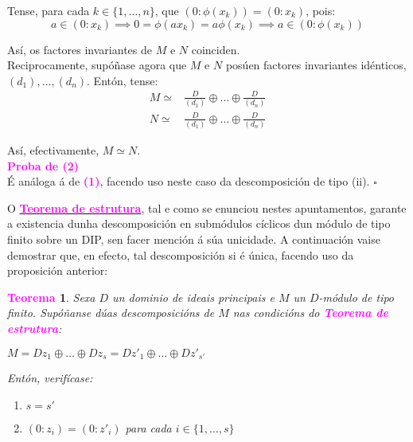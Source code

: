 \documentclass[twoside]{report}
\newcommand{\magbf}[1]{\textcolor{magenta}{\textbf{#1}}} %
\theoremstyle{mystyle}
\newtheorem{theo}{\magbf{Teorema}}[chapter]
\newenvironment{theorem}
{\begin{mdframed}[linecolor = magenta,backgroundcolor = classicrose, linewidth = 2mm]\begin{theo}}
{\end{theo}\end{mdframed}}
\begin{document}
\noindent Tense, para cada $k \in \{1, \dots, n\}$, que $(0 : \phi(x_{k})) = (0 : x_{k})$, pois:
$$a \in (0 : x_{k}) \implies 0 = \phi(ax_{k}) = a \phi(x_{k}) \implies a \in (0 : \phi(x_{k}))$$

\noindent Así, os factores invariantes de $M$ e $N$ coinciden.\\

\noindent {} Reciprocamente, supóñase agora que $M$ e $N$ posúen factores invariantes idénticos, $(d_{1}), \dots, (d_{n})$. Entón, tense:
\begin{align*}
    M \simeq & \displaystyle \frac{D}{(d_{1})} \oplus \dots \oplus \frac{D}{(d_{n})} \\
    N \simeq & \displaystyle \frac{D}{(d_{1})} \oplus \dots \oplus \frac{D}{(d_{n})}  
\end{align*}

\noindent Así, efectivamente, $M \simeq N$.\\

\noindent \magbf{Proba de (2)}\\

\noindent É análoga á de \magbf{(1)}, facendo uso neste caso da descomposición de tipo (ii). $\square$\\

\vspace{3mm}

\noindent O \hyperref[th4.2]{\magbf{Teorema de estrutura}}, tal e como se enunciou nestes apuntamentos, garante a existencia dunha descomposición en submódulos cíclicos dun módulo de tipo finito sobre un DIP, sen facer mención á súa unicidade. A continuación vaise demostrar que, en efecto, tal descomposición si é única, facendo uso da proposición anterior:\\

\begin{theorem} \label{th4.4}
Sexa $D$ un dominio de ideais principais e $M$ un $D$-módulo de tipo finito. Supóñanse dúas descomposicións de $M$ nas condicións do \magbf{Teorema de estrutura}:
\begin{center}
    $M = Dz_{1} \oplus \dots \oplus Dz_{s} = Dz'_{1} \oplus \dots \oplus Dz'_{s'}$ 
\end{center} 
Entón, verifícase:
\begin{enumerate}
    \item $s = s'$
    \item $(0 : z_{i}) = (0 : z'_{i})$ para cada $i \in \{1, \dots, s\}$
\end{enumerate}
\end{theorem}
\end{document}
